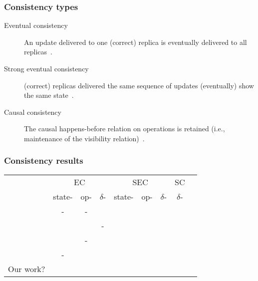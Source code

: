 \documentclass[aspectratio=169,compress]{beamer}
\newcommand{\cmark}{\ding{51}}
\begin{document}
  \begin{frame}
    \frametitle{Consistency types}

    \begin{description}
      \item[Eventual consistency] An update delivered to one (correct) replica
        is eventually delivered to all replicas~\citep{shapiro11}.
      \item[Strong eventual consistency] (correct) replicas delivered the same
        sequence of updates (eventually) show the same state~\citep{shapiro11}.
      \item[Causal consistency] The causal happens-before relation on operations
        is retained (i.e., maintenance of the visibility
        relation)~\citep{almeida16}.
    \end{description}
  \end{frame}

  \begin{frame}
    \frametitle{Consistency results}


    \begin{table}
      \begin{tabular}{rcccccccc}
        & \multicolumn{3}{c}{EC}
        & \multicolumn{3}{c}{SEC}
        & \multicolumn{1}{c}{SC} \\
        \cmidrule(lr){2-4} \cmidrule(lr){5-7} \cmidrule(lr){8-8}
          & state- & op- & $\delta$-
          & state- & op- & $\delta$-
          & $\delta$- \\
        \midrule
          \cite{shapiro11} & - & - & & \cmark & \cmark & & \\
          \cite{almeida16} & & & - & & & \cmark & \cmark   \\
          \cite{gomes17} & & - & & & \cmark\footnotemark[1] & & \\
          \cite{zeller14} & - & & & \cmark\footnotemark[2] & & & \\
          \pause
          Our work? & & & & & & \color{red}{\cmark\footnotemark[1]} & \\
      \end{tabular}
    \end{table}
  \end{frame}
\end{document}
